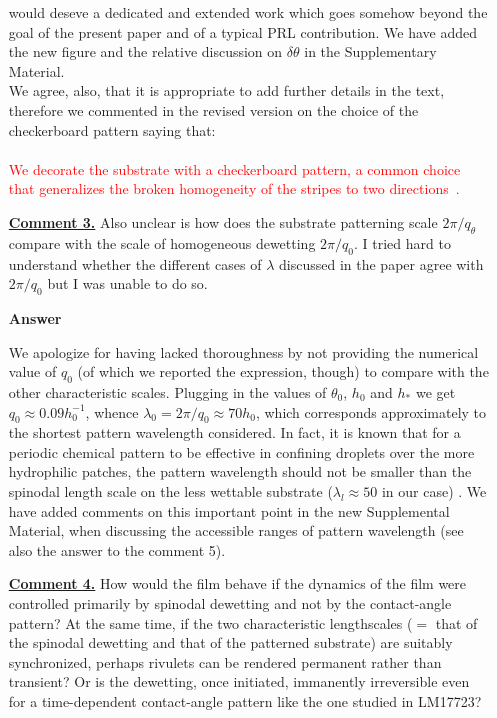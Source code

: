 \documentclass[12pt,english]{article}
\newcommand{\JH}[1]{\textcolor{blue}{JH: #1}}
\begin{document}
\begin{itemize}
{would deseve a dedicated and extended work which goes somehow beyond the goal of the present paper and of a typical PRL contribution.
We have added the new figure and the relative discussion on $\delta \theta$ in the
Supplementary Material.\\
We agree, also, that it is appropriate to add further details in the text, therefore we commented in the revised version on the choice of the checkerboard pattern saying that:\\
\\
\textcolor{red}{We decorate the substrate with a checkerboard pattern, a common choice that generalizes the broken homogeneity of the stripes to two 
directions~\cite{Jalali2018,Nagayama2020,Das2020}.}

}

\item[ \textbf{\underline{Comment 3.}}]
{ 
Also unclear is how does the substrate patterning scale $2\pi/q_\theta$ compare with the scale of homogeneous dewetting $2\pi/q_0$.
I tried hard to understand whether the different cases of $\lambda$ discussed in the paper agree with $2\pi/q_0$ but I was unable to do so. 
}

\item[ \textbf{{Answer}}]
{
We apologize for having lacked thoroughness by not providing the numerical 
value of $q_0$ (of which we reported the expression, though) to compare with the 
other characteristic scales. Plugging in the values of $\theta_0$,
$h_0$ and $h_{\ast}$ we get $q_0 \approx 0.09 h_0^{-1}$, whence 
$\lambda_0 = 2\pi/q_0 \approx 70 h_0$, which corresponds approximately to the shortest pattern wavelength considered. 
In fact, it is known that for a periodic chemical pattern to be effective in 
confining droplets over the more hydrophilic patches, the pattern wavelength should 
not be smaller than the spinodal length scale on the less wettable substrate
($\lambda_l \approx 50$ in our case) \cite{KarguptaJCP2002,KarguptaLangmuir2000,Nisato1999,Karim1998}.
We have added comments on this important point in the new Supplemental Material, when discussing the accessible ranges of pattern wavelength (see also the answer to the comment 5).

}

\item[ \textbf{\underline{Comment 4.}}]
{  
How would the film behave if the dynamics of the film were controlled primarily by spinodal dewetting and not by the contact-angle pattern?
At the same time, if the two characteristic lengthscales ($=$ that of the spinodal dewetting and that of the patterned substrate) are suitably synchronized, perhaps rivulets can be rendered permanent rather than transient? Or is the dewetting, once initiated, immanently irreversible even for a
time-dependent contact-angle pattern like the one studied in LM17723?
}


\end{itemize}
\end{document}

